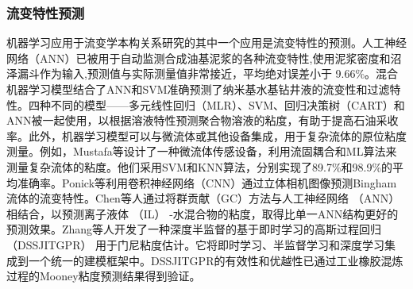 \subsubsection{流变特性预测}
机器学习应用于流变学本构关系研究的其中一个应用是流变特性的预测。人工神经网络（ANN）已被用于自动监测合成油基泥浆的各种流变特性,使用泥浆密度和沼泽漏斗作为输入,预测值与实际测量值非常接近，平均绝对误差小于 9.66\%\cite{alsabaaMachineLearningModel2022}。混合机器学习模型结合了ANN和SVM准确预测了纳米基水基钻井液的流变性和过滤特性。四种不同的模型——多元线性回归（MLR）、SVM、回归决策树（CART）和ANN被一起使用，以根据溶液特性预测聚合物溶液的粘度，有助于提高石油采收率\cite{shakeel2023application}。此外，机器学习模型可以与微流体或其他设备集成，用于复杂流体的原位粘度测量。例如，Mustafa等设计了一种微流体传感设备，利用流固耦合和ML算法来测量复杂流体的粘度\cite{mustafaMachineLearningBased2023}。他们采用SVM和KNN算法，分别实现了89.7\%和98.9\%的平均准确率。Ponick等利用卷积神经网络（CNN）通过立体相机图像预测Bingham流体的流变特性\cite{Ponick2022}。Chen等人通过将群贡献（GC）方法与人工神经网络 （ANN） 相结合，以预测离子液体 （IL） -水混合物的粘度\cite{CHEN2022118546}，取得比单一ANN结构更好的预测效果。Zhang等人开发了一种深度半监督的基于即时学习的高斯过程回归 （DSSJITGPR） 用于门尼粘度估计\cite{polym14051018}。它将即时学习、半监督学习和深度学习集成到一个统一的建模框架中。DSSJITGPR的有效性和优越性已通过工业橡胶混炼过程的Mooney粘度预测结果得到验证。

